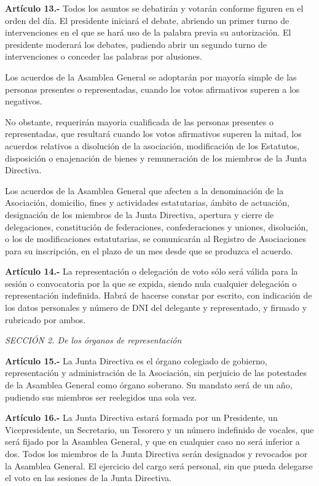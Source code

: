 \documentclass[a4paper,12pt]{article}
\begin{document}
\begin{onehalfspace}
\bigskip\bigskip

\textbf{Artículo 13.-} Todos los asuntos se debatirán y votarán conforme figuren en el orden del día. El presidente iniciará el debate, abriendo un primer turno de intervenciones en el que se hará uso de la palabra previa su autorización. El presidente moderará los debates, pudiendo abrir un segundo turno de intervenciones o conceder las palabras por alusiones.

Los acuerdos de la Asamblea General se adoptarán por mayoría simple de las personas presentes o representadas, cuando los votos afirmativos superen a los negativos.

No obstante, requerirán mayoria cualificada de las personas presentes o representadas, que resultará cuando los votos afirmativos superen la mitad, los acuerdos relativos a disolución de la asociación, modificación de los Estatutos, disposición o enajenación de bienes y remuneración de los miembros de la Junta Directiva.

Los acuerdos de la Asamblea General que afecten a la denominación de la Asociación, domicilio, fines y actividades estatutarias, ámbito de actuación, designación de los miembros de la Junta Directiva, apertura y cierre de delegaciones, constitución de federaciones, confederaciones y uniones, disolución, o los de modificaciones estatutarias, se comunicarán al Registro de Asociaciones para su inscripción, en el plazo de un mes desde que se produzca el acuerdo.

\bigskip\bigskip

\textbf{Artículo 14.-} La representación o delegación de voto sólo será válida para la sesión o convocatoria por la que se expida, siendo nula cualquier delegación o representación indefinida. Habrá de hacerse constar por escrito, con indicación de los datos personales y número de DNI del delegante y representado, y firmado y rubricado por ambos.

\bigskip\bigskip

\textit{SECCIÓN 2\textordfeminine. De los órganos de representación}

\bigskip\bigskip

\textbf{Artículo 15.-} La Junta Directiva es el órgano colegiado de gobierno, representación y administración de la Asociación, sin perjuicio de las potestades de la Asamblea General como órgano soberano. Su mandato será de un año, pudiendo sus miembros ser reelegidos una sola vez.

\bigskip\bigskip

\textbf{Artículo 16.-} La Junta Directiva estará formada por un Presidente, un Vicepresidente, un Secretario, un Tesorero y un número indefinido de vocales, que será fijado por la Asamblea General, y que en cualquier caso no será inferior a dos. Todos los miembros de la Junta Directiva serán designados y revocados por la Asamblea General. El ejercicio del cargo será personal, sin que pueda delegarse el voto en las sesiones de la Junta Directiva.


\end{onehalfspace}
\end{document}
